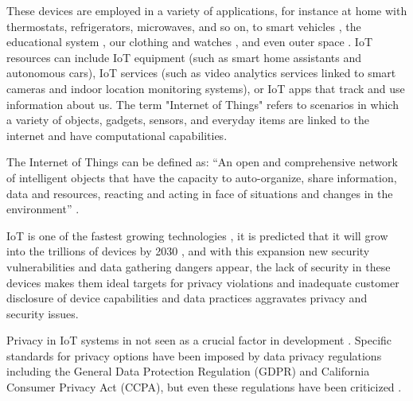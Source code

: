 \documentclass[manuscript,natbib=false]{acmart}
\begin{document}
These devices are employed in a variety of applications, for instance at home \cite{marikyan2019systematic}
with thermostats, refrigerators, microwaves, and so on, to
smart vehicles \cite{arena2020overview}, the educational system \cite{al2020survey},
our clothing and watches \cite{niknejad2020comprehensive}, and even
outer space \cite{AkyildizInternet}. IoT resources can include IoT equipment (such as smart home
assistants and autonomous cars), IoT services (such as video analytics
services linked to smart cameras and indoor location monitoring systems),
or IoT apps that track and use information about us. The term "Internet of
Things" refers to scenarios in which a variety of objects, gadgets, sensors,
and everyday items are linked to the internet and have computational capabilities.


The Internet of Things can be defined as: ``An open and comprehensive network
of intelligent objects that have the capacity to auto-organize, share information,
data and resources, reacting and acting in face of situations and changes
in the environment'' \cite{madakam2015internet}.

IoT is one of the fastest growing technologies \cite{MohammadState}, it
is predicted that it will grow into the trillions of devices by 2030 \cite{SarawiInternet},
and with this expansion new security vulnerabilities and data gathering
dangers appear, the lack of security in these devices makes them ideal targets
for privacy violations and inadequate customer disclosure of device capabilities
and data practices aggravates privacy and security issues.

Privacy in IoT systems in not seen as a crucial factor in development \cite{alhirabi2021security}.
Specific standards for privacy options have been imposed by data privacy
regulations including the General Data Protection Regulation (GDPR) and
California Consumer Privacy Act (CCPA), but even these regulations have
been criticized \cite{peloquin2020disruptive, gladis2022weaponizing, gentile2022deficient, green2022flaws, byun2019privacy}.
\end{document}

